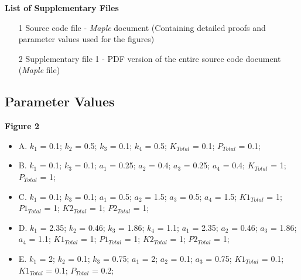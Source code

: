 \documentclass[9pt,lineno]{elife}
\begin{document}
\begin{appendixbox}
\vspace*{2cm}

\textbf{List of Supplementary Files}
\begin{itemize}
    \item[1] Source code file - \textit{Maple} document (Containing detailed proofs and parameter values used for the figures)
    \item[2] Supplementary file 1 - PDF version of the entire source code document (\textit{Maple} file)
\end{itemize}




\end{appendixbox}

\begin{appendixbox}
\subsection*{Parameter Values}

\small \indent

\textbf{Figure 2}
\begin{itemize}
    \item A. $k_1$ = 0.1;  $k_2$ = 0.5;  $k_3$ = 0.1;  $k_4$ = 0.5; $K_{Total}$ = 0.1;  $P_{Total}$ = 0.1;  
    
    
    
    \item B. $k_1$ = 0.1; $k_3$ = 0.1; $a_1$ = 0.25; $a_2$ = 0.4; $a_3$ = 0.25; $a_4$ = 0.4; $K_{Total}$ = 1;  $P_{Total}$ = 1; 
    
    \item C. $k_1$ = 0.1; $k_3$ = 0.1; $a_1$ = 0.5; $a_2$ = 1.5; $a_3$ = 0.5; $a_4$ = 1.5;  $K1_{Total}$ = 1;  $P1_{Total}$ = 1; $K2_{Total}$ = 1;  $P2_{Total}$ = 1;
    
    \item D. $k_1$ = 2.35; $k_2$ = 0.46; $k_3$ = 1.86; $k_4$ = 1.1; $a_1$ = 2.35; $a_2$ = 0.46; $a_3$ = 1.86; $a_4$ = 1.1;  $K1_{Total}$ = 1;  $P1_{Total}$ = 1; $K2_{Total}$ = 1;  $P2_{Total}$ = 1;
    
    \item E. $k_1$ = 2;  $k_2$ = 0.1;  $k_3$ = 0.75; $a_1$ = 2; $a_2$ = 0.1; $a_3$ = 0.75; $K1_{Total}$ = 0.1; $K1_{Total}$ = 0.1;  $P_{Total}$ = 0.2;  
\end{itemize}


\end{appendixbox}
\end{document}
